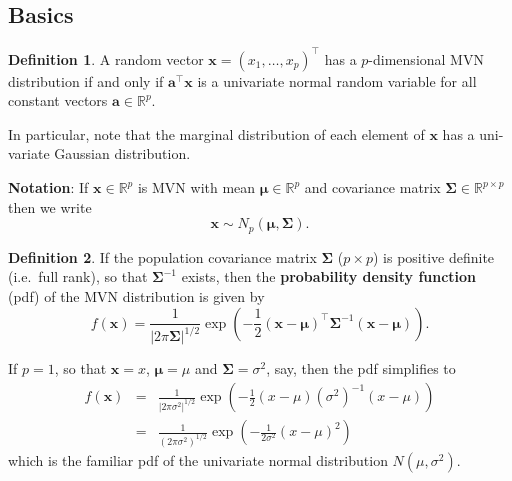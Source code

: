 \documentclass[]{book}
\theoremstyle{definition}
\newtheorem{definition}{Definition}[chapter]
\theoremstyle{definition}
\theoremstyle{definition}
\theoremstyle{remark}
\begin{document}
\hypertarget{basics}{%
\subsection{Basics}\label{basics}}

\begin{definition}
\protect\hypertarget{def:mvn}{}{\label{def:mvn} }A random vector \(\mathbf x=(x_1, \ldots , x_p)^\top\) has a \(p\)-dimensional MVN distribution if and only if \(\mathbf a^\top \mathbf x\) is a univariate normal random variable for all constant vectors \(\mathbf a\in \mathbb{R}^p\).
\end{definition}

In particular, note that the marginal distribution of each element of \(\mathbf x\) has a uni-variate Gaussian distribution.

\textbf{Notation}: \quad If \(\mathbf x\in \mathbb{R}^p\) is MVN with mean \({\boldsymbol{\mu}}\in \mathbb{R}^p\) and covariance matrix \(\boldsymbol{\Sigma}\in \mathbb{R}^{p\times p}\) then we write
\[ \mathbf x\sim N_p ({\boldsymbol{\mu}}, \boldsymbol{\Sigma}).\]

\begin{definition}
\protect\hypertarget{def:mvnpdf}{}{\label{def:mvnpdf} }If the population covariance matrix \(\boldsymbol{\Sigma}\) (\(p \times p\)) is positive definite (i.e.~full rank), so that \(\boldsymbol{\Sigma}^{-1}\) exists,
then the \textbf{probability density function} (pdf) of the MVN distribution is given by
\[ f(\mathbf x) = \frac{1}{| 2 \pi \boldsymbol{\Sigma}|^{1/2}} \exp \left(-\frac{1}{2}(\mathbf x- {\boldsymbol{\mu}})^\top \boldsymbol{\Sigma}^{-1} (\mathbf x- {\boldsymbol{\mu}}) \right).\]
\end{definition}

If \(p=1\), so that \(\mathbf x= x\), \({\boldsymbol{\mu}}= \mu\) and \(\boldsymbol{\Sigma}= \sigma^2\), say, then the pdf simplifies to
\begin{eqnarray*}
f(\mathbf x) &=& \frac{1}{|2 \pi \sigma^2|^{1/2}} \exp \left(-\frac{1}{2}(x - \mu) (\sigma^2)^{-1} (x - \mu) \right)\\
&=& \frac{1}{(2 \pi \sigma^2)^{1/2}} \exp \left(-\frac{1}{2 \sigma^2}(x - \mu)^2 \right)
\end{eqnarray*}
which is the familiar pdf of the univariate normal distribution \(N(\mu,\sigma^2)\).
\end{document}
